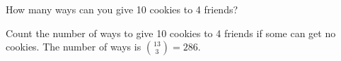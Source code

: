 \question How many ways can you give 10 cookies to 4 friends?

\begin{solution}[.5 in]
Count the number of ways to give 10 cookies to 4 friends if 
some can get no cookies. The number of ways is
${13 \choose 3}  = 286.$
\end{solution}